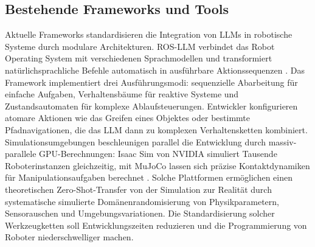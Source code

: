 \subsection{Bestehende Frameworks und Tools}

Aktuelle Frameworks standardisieren die Integration von LLMs in robotische
Systeme durch modulare Architekturen. ROS-LLM verbindet das Robot Operating
System mit verschiedenen Sprachmodellen und transformiert natürlichsprachliche
Befehle automatisch in ausführbare Aktionssequenzen . Das Framework implementiert drei Ausführungsmodi: sequenzielle
Abarbeitung für einfache Aufgaben, Verhaltensbäume für reaktive Systeme und
Zustandsautomaten für komplexe Ablaufsteuerungen. Entwickler konfigurieren
atomare Aktionen wie das Greifen eines Objektes oder bestimmte Pfadnavigationen,
die das LLM dann zu komplexen Verhaltensketten kombiniert. Simulationsumgebungen
beschleunigen parallel die Entwicklung durch massiv-parallele GPU-Berechnungen:
Isaac Sim von NVIDIA simuliert Tausende Roboterinstanzen gleichzeitig, mit
MuJoCo lassen sich präzise Kontaktdynamiken für Manipulationsaufgaben berechnet
. Solche Plattformen ermöglichen einen theoretischen Zero-Shot-Transfer
von der Simulation zur Realität durch systematische simulierte
Domänenrandomisierung von Physikparametern, Sensorauschen und
Umgebungsvariationen. Die Standardisierung solcher Werkzeugketten soll
Entwicklungszeiten reduzieren und die Programmierung von Roboter
niederschwelliger machen.
